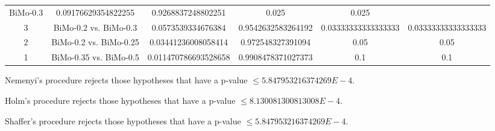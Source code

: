 \documentclass[a4paper,10pt]{article}
\begin{document}
\begin{landscape}
\begin{table}[!htp]
\begin{tabular}{cccccc}
BiMo-0.3&0.09176629354822255&0.9268837248802251&0.025&0.025\\3&BiMo-0.2 vs. BiMo-0.3&0.0573539334676384&0.9542632583264192&0.03333333333333333&0.03333333333333333\\2&BiMo-0.2 vs. BiMo-0.25&0.03441236008058414&0.972548327391094&0.05&0.05\\1&BiMo-0.35 vs. BiMo-0.5&0.011470786693528658&0.9908478371027373&0.1&0.1\\\hline
\end{tabular}
\end{table}
Nemenyi's procedure rejects those hypotheses that have a p-value $\le5.847953216374269E-4$.


Holm's procedure rejects those hypotheses that have a p-value $\le8.130081300813008E-4$.


Shaffer's procedure rejects those hypotheses that have a p-value $\le5.847953216374269E-4$.



\end{landscape}
\end{document}
